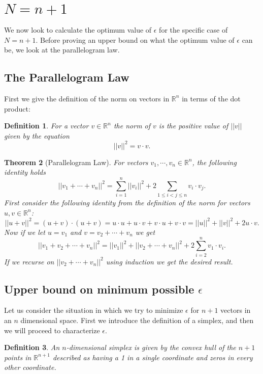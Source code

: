 \documentclass[11pt,letterpaper,twoside,english]{article}
\theoremstyle{theorem}
\newtheorem{theorem}{Theorem}[section]
\newtheorem{definition}[theorem]{Definition}
\theoremstyle{remark}
\providecommand{\R}{\mathbb{R}}
\begin{document}
\section{$N = n+1$}

We now look to calculate the optimum value of $\epsilon$ for the specific case of $N = n+1$. Before proving an upper bound on what the optimum value of $\epsilon$ can be, we look at the parallelogram law.

\subsection{The Parallelogram Law}

First we give the definition of the norm on vectors in $\R^n$ in terms of the dot product:

\begin{definition}
For a vector $v\in\R^n$ the norm of $v$ is the positive value of $||v||$ given by the equation
$$
||v||^2=v\cdot v.
$$
\end{definition}
\begin{theorem}[Parallelogram Law]
For vectors $v_1,\cdots,v_n\in\R^n$, the following identity holds
$$
||v_1+\cdots+v_n||^2=\displaystyle\sum_{i=1}^n||v_i||^2+2\displaystyle\sum_{1\le i<j\le n}v_i\cdot v_j.
$$
\proof
First consider the following identity from the definition of the norm for vectors $u,v\in\R^n$:
$$
||u+v||^2=(u+v)\cdot (u+v)=u\cdot u+u\cdot v+ v\cdot u + v\cdot v=||u||^2+||v||^2+2u\cdot v.
$$
Now if we let $u=v_1$ and $v= v_2+\cdots+v_n$ we get 
$$
||v_1+v_2+\cdots+v_n||^2=||v_1||^2+||v_2+\cdots +v_n||^2+2\sum_{i=2}^n v_1\cdot v_i.
$$
If we recurse on $||v_2+\cdots +v_n||^2$ using induction we get the desired result. 
\end{theorem}


\subsection{Upper bound on minimum possible $\epsilon$}
Let us consider the situation in which we try to minimize $\epsilon$ for $n+1$ vectors in an $n$ dimensional space. First we introduce the definition of a simplex, and then we will proceed to characterize $\epsilon$. 

\begin{definition}
An $n$-dimensional simplex is given by the convex hull of the $n+1$ points in $\R^{n+1}$ described as having a 1 in a single coordinate and zeros in every other coordinate. 
\end{definition}
\end{document}
